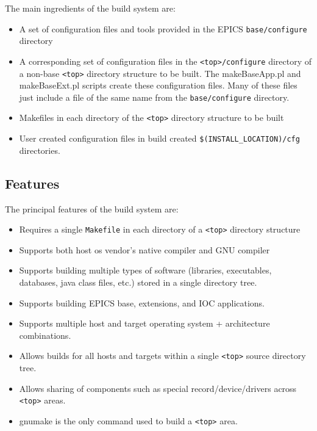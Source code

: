 The main ingredients of the build system are:

\begin{itemize}
\item A set of configuration files and tools provided in the EPICS \verb|base/configure| directory

\item A corresponding set of configuration files in the \verb|<top>/configure| directory of a non-base \verb|<top>| directory structure
to be built. The makeBaseApp.pl and makeBaseExt.pl scripts create these configuration files. Many of these files
just include a file of the same name from the \verb|base/configure| directory.

\item Makefiles in each directory of the \verb|<top>| directory structure to be built

\item User created configuration files in build created \verb|$(INSTALL_LOCATION)/cfg| directories.
\end{itemize}

\subsection{Features}

The principal features of the build system are:

\begin{itemize}
\item Requires a single \verb|Makefile| in each directory of a \verb|<top>| directory structure

\item Supports both host os vendor's native compiler and GNU compiler

\item Supports building multiple types of software (libraries, executables, databases, java class files, etc.) stored in a 
single directory tree.

\item Supports building EPICS base, extensions, and IOC applications.

\item Supports multiple host and target operating system + architecture combinations.

\item Allows builds for all hosts and targets within a single \verb|<top>| source directory tree.

\item Allows sharing of components such as special record/device/drivers across \verb|<top>| areas.

\item gnumake is the only command used to build a \verb|<top>| area.
\end{itemize}

